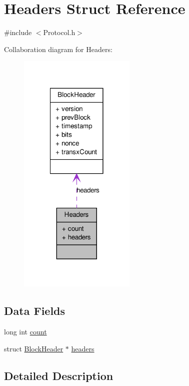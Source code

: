 \hypertarget{struct_headers}{
\section{Headers Struct Reference}
\label{struct_headers}
}


{\ttfamily \#include $<$Protocol.h$>$}



Collaboration diagram for Headers:\nopagebreak
\begin{figure}[H]
\begin{center}
\leavevmode
\includegraphics[width=158pt]{struct_headers__coll__graph}
\end{center}
\end{figure}
\subsection*{Data Fields}
\begin{DoxyCompactItemize}
\item 
long int \hyperlink{struct_headers_aabbb2f7768ed83b49f05e7911e3a693a}{count}
\item 
struct \hyperlink{struct_block_header}{BlockHeader} $\ast$ \hyperlink{struct_headers_a0b894950328debae0613f43ca1f0dc64}{headers}
\end{DoxyCompactItemize}


\subsection{Detailed Description}


